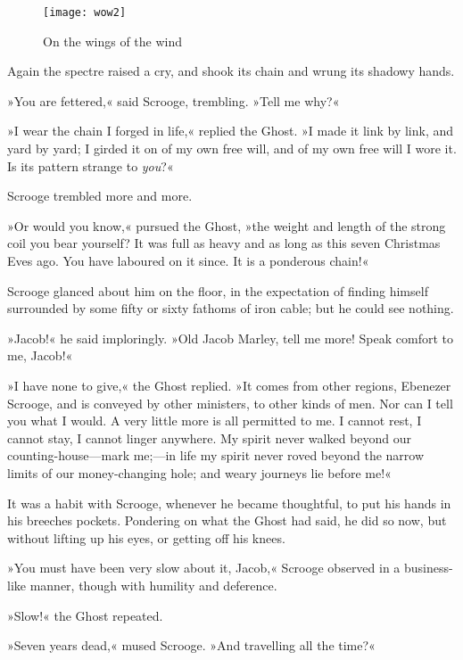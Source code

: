 \begin{letter}
	\begin{figure}[b!]
		\centering
		\texttt{[image: wow2]}
		\caption{On the wings of the wind}
	\end{figure}
\end{letter}

Again the spectre raised a cry, and shook its chain and wrung its shadowy hands.

»You are fettered,« said Scrooge, trembling. »Tell me why?«

»I wear the chain I forged in life,« replied the Ghost. »I made it link by link, and yard by yard; I girded it on of my own free will, and of my own free will I wore it. Is its pattern strange to \textit{you}?«

Scrooge trembled more and more.

»Or would you know,« pursued the Ghost, »the weight and length of the strong coil you bear yourself? It was full as heavy and as long as this seven Christmas Eves ago. You have laboured on it since. It is a ponderous chain!«

Scrooge glanced about him on the floor, in the expectation of finding himself surrounded by some fifty or sixty fathoms of iron cable; but he could see nothing.

»Jacob!« he said imploringly. »Old Jacob Marley, tell me more! Speak comfort to me, Jacob!«



»I have none to give,« the Ghost replied. »It comes from other regions, Ebenezer Scrooge, and is conveyed by other ministers, to other kinds of men. Nor can I tell you what I would. A very little more is all permitted to me. I cannot rest, I cannot stay, I cannot linger anywhere. My spirit never walked beyond our counting-house---mark me;---in life my spirit never roved beyond the narrow limits of our money-changing hole; and weary journeys lie before me!«

It was a habit with Scrooge, whenever he became thoughtful, to put his hands in his breeches pockets. Pondering on what the Ghost had said, he did so now, but without lifting up his eyes, or getting off his knees.

»You must have been very slow about it, Jacob,« Scrooge observed in a business-like manner, though with humility and deference.

»Slow!« the Ghost repeated.

»Seven years dead,« mused Scrooge. »And travelling all the time?«

